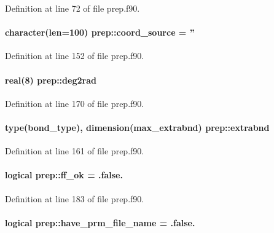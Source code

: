 Definition at line 72 of file prep.\-f90.

\hypertarget{classprep_a23c49c42a55467a3ef357748fb876a49}{
\paragraph[{coord\-\_\-source}]{\setlength{\rightskip}{0pt plus 5cm}character(len=100) prep\-::coord\-\_\-source = ''}}\label{classprep_a23c49c42a55467a3ef357748fb876a49}


Definition at line 152 of file prep.\-f90.

\hypertarget{classprep_a7b7c9985659296eb39ad6c6be3b156a7}{
\paragraph[{deg2rad}]{\setlength{\rightskip}{0pt plus 5cm}real(8) prep\-::deg2rad}}\label{classprep_a7b7c9985659296eb39ad6c6be3b156a7}


Definition at line 170 of file prep.\-f90.

\hypertarget{classprep_ad8cf2067e77b186f2d5601ee6da085c1}{
\paragraph[{extrabnd}]{\setlength{\rightskip}{0pt plus 5cm}type(bond\-\_\-type), dimension({\bf max\-\_\-extrabnd}) prep\-::extrabnd}}\label{classprep_ad8cf2067e77b186f2d5601ee6da085c1}


Definition at line 161 of file prep.\-f90.

\hypertarget{classprep_ad93c90f3fad2706aabf577cd4a7bc3e5}{
\paragraph[{ff\-\_\-ok}]{\setlength{\rightskip}{0pt plus 5cm}logical prep\-::ff\-\_\-ok = .false.}}\label{classprep_ad93c90f3fad2706aabf577cd4a7bc3e5}


Definition at line 183 of file prep.\-f90.

\hypertarget{classprep_af4d8bdabfcb632efdd69f7f9459d4cb1}{
\paragraph[{have\-\_\-prm\-\_\-file\-\_\-name}]{\setlength{\rightskip}{0pt plus 5cm}logical prep\-::have\-\_\-prm\-\_\-file\-\_\-name = .false.}}\label{classprep_af4d8bdabfcb632efdd69f7f9459d4cb1}


